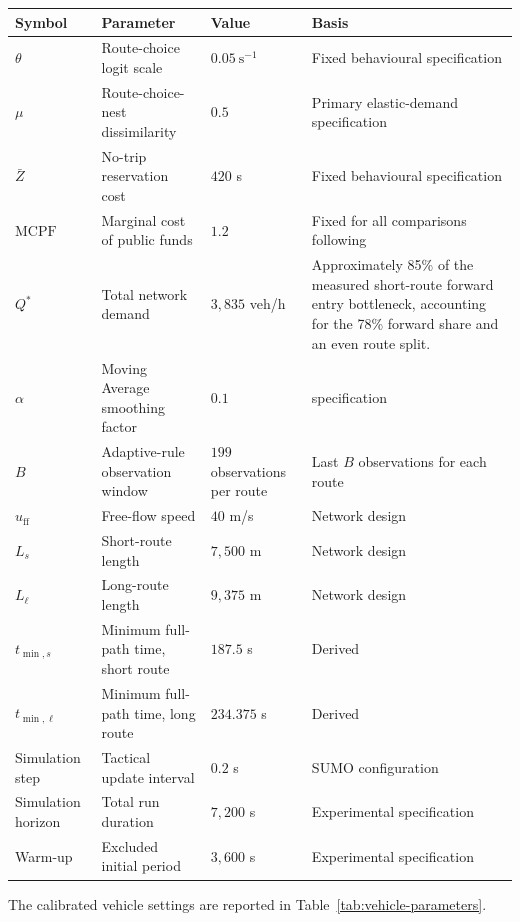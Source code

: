 \documentclass{article}
\begin{document}
\begin{center}
\small
\begin{tabular}{@{}p{}p{}p{}p{}@{}}
\toprule
\textbf{Symbol} & \textbf{Parameter} & \textbf{Value} & \textbf{Basis} \\
\midrule
$\theta$ & Route-choice logit scale & $0.05\ \mathrm{s}^{-1}$ & Fixed behavioural specification \\
$\mu$ & Route-choice-nest dissimilarity & $0.5$ & Primary elastic-demand specification \\
$\bar Z$ & No-trip reservation cost & $420$ s & Fixed behavioural specification \\
$\mathrm{MCPF}$ & Marginal cost of public funds & $1.2$ & Fixed for all comparisons following \textcite{adlerEtAl2010} \\
$Q^*$ & Total network demand & $3{,}835$ veh/h & Approximately 85\% of the measured short-route forward entry bottleneck, accounting for the 78\% forward share and an even route split. \\
$\alpha$ & Moving Average smoothing factor & $0.1$ & \textcite{davis2009} specification \\
$B$ & Adaptive-rule observation window & $199$ observations per route & Last $B$ observations for each route \\
$u_{\mathrm{ff}}$ & Free-flow speed & $40$ m/s & Network design \\
$L_s$ & Short-route length & $7{,}500$ m & Network design \\
$L_{\ell}$ & Long-route length & $9{,}375$ m & Network design \\
$t_{\min,s}$ & Minimum full-path time, short route & $187.5$ s & Derived \\
$t_{\min,\ell}$ & Minimum full-path time, long route & $234.375$ s & Derived \\
Simulation step & Tactical update interval & $0.2$ s & SUMO configuration \\
Simulation horizon & Total run duration & $7{,}200$ s & Experimental specification \\
Warm-up & Excluded initial period & $3{,}600$ s & Experimental specification \\
\bottomrule
\end{tabular}
\end{center}

The calibrated vehicle settings are reported in Table~\ref{tab:vehicle-parameters}.
\end{document}
